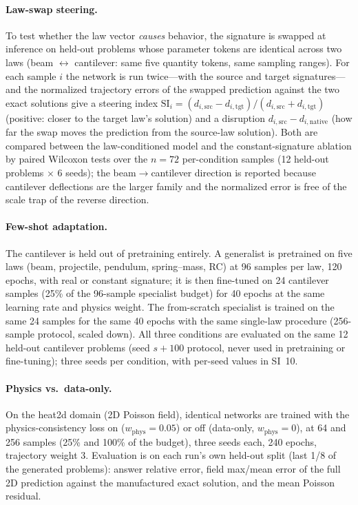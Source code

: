 \documentclass[11pt,a4paper]{article}
\begin{document}
\paragraph{Law-swap steering.} To test whether the law vector \emph{causes}
behavior, the signature is swapped at inference on held-out problems whose
parameter tokens are identical across two laws (beam $\leftrightarrow$
cantilever: same five quantity tokens, same sampling ranges). For each sample
$i$ the network is run twice---with the source and target signatures---and
the normalized trajectory errors of the swapped prediction against the two
exact solutions give a steering index
$\mathrm{SI}_i=(d_{i,\mathrm{src}}-d_{i,\mathrm{tgt}})/(d_{i,\mathrm{src}}+d_{i,\mathrm{tgt}})$
(positive: closer to the target law's solution) and a disruption
$d_{i,\mathrm{src}}-d_{i,\mathrm{native}}$ (how far the swap moves the
prediction from the source-law solution). Both are compared between the
law-conditioned model and the constant-signature ablation by paired
Wilcoxon tests over the $n{=}72$ per-condition samples (12 held-out
problems $\times$ 6 seeds); the beam$\to$cantilever direction is reported
because cantilever deflections are the larger family and the normalized
error is free of the scale trap of the reverse direction.

\paragraph{Few-shot adaptation.} The cantilever is held out of pretraining
entirely. A generalist is pretrained on five laws (beam, projectile,
pendulum, spring--mass, RC) at 96 samples per law, 120 epochs, with real or
constant signature; it is then fine-tuned on 24 cantilever samples (25\% of
the 96-sample specialist budget) for 40 epochs at the same learning rate
and physics weight. The from-scratch specialist is trained on the same 24
samples for the same 40 epochs with the same single-law procedure
(256-sample protocol, scaled down). All three conditions are evaluated on
the same 12 held-out cantilever problems (seed $s{+}100$ protocol, never
used in pretraining or fine-tuning); three seeds per condition, with
per-seed values in SI~10.

\paragraph{Physics vs.\ data-only.} On the heat2d domain (2D Poisson field),
identical networks are trained with the physics-consistency loss on
($w_{\mathrm{phys}}=0.05$) or off (data-only, $w_{\mathrm{phys}}=0$), at
64 and 256 samples (25\% and 100\% of the budget), three seeds each, 240
epochs, trajectory weight 3. Evaluation is on each run's own held-out
split (last 1/8 of the generated problems): answer relative error, field
max/mean error of the full 2D prediction against the manufactured exact
solution, and the mean Poisson residual.
\end{document}
